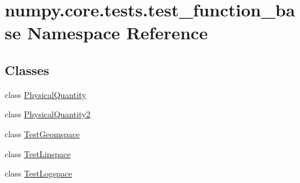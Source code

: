 \hypertarget{namespacenumpy_1_1core_1_1tests_1_1test__function__base}{}\section{numpy.\+core.\+tests.\+test\+\_\+function\+\_\+base Namespace Reference}
\label{namespacenumpy_1_1core_1_1tests_1_1test__function__base}
\subsection*{Classes}
\begin{DoxyCompactItemize}
\item 
class \hyperlink{classnumpy_1_1core_1_1tests_1_1test__function__base_1_1PhysicalQuantity}{Physical\+Quantity}
\item 
class \hyperlink{classnumpy_1_1core_1_1tests_1_1test__function__base_1_1PhysicalQuantity2}{Physical\+Quantity2}
\item 
class \hyperlink{classnumpy_1_1core_1_1tests_1_1test__function__base_1_1TestGeomspace}{Test\+Geomspace}
\item 
class \hyperlink{classnumpy_1_1core_1_1tests_1_1test__function__base_1_1TestLinspace}{Test\+Linspace}
\item 
class \hyperlink{classnumpy_1_1core_1_1tests_1_1test__function__base_1_1TestLogspace}{Test\+Logspace}
\end{DoxyCompactItemize}
